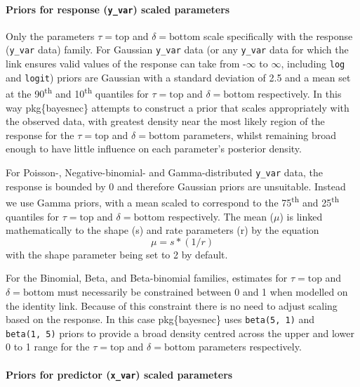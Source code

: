 \documentclass[
]{jss}
\begin{document}
\hypertarget{priors-for-response-y_var-scaled-parameters}{%
\paragraph{\texorpdfstring{Priors for response (\texttt{y\_var}) scaled
parameters}{Priors for response (y\_var) scaled parameters}}\label{priors-for-response-y_var-scaled-parameters}}

Only the parameters \(\tau = \text{top}\) and \(\delta = \text{bottom}\)
scale specifically with the response (\texttt{y\_var} data) family. For
Gaussian \texttt{y\_var} data (or any \texttt{y\_var} data for which the
link ensures valid values of the response can take from -\(\infty\) to
\(\infty\), including \texttt{log} and \texttt{logit}) priors are
Gaussian with a standard deviation of 2.5 and a mean set at the
90\textsuperscript{th} and 10\textsuperscript{th} quantiles for
\(\tau = \text{top}\) and \(\delta = \text{bottom}\) respectively. In
this way pkg\{bayesnec\} attempts to construct a prior that scales
appropriately with the observed data, with greatest density near the
most likely region of the response for the \(\tau = \text{top}\) and
\(\delta = \text{bottom}\) parameters, whilst remaining broad enough to
have little influence on each parameter's posterior density.

For Poisson-, Negative-binomial- and Gamma-distributed \texttt{y\_var}
data, the response is bounded by 0 and therefore Gaussian priors are
unsuitable. Instead we use Gamma priors, with a mean scaled to
correspond to the 75\textsuperscript{th} and 25\textsuperscript{th}
quantiles for \(\tau = \text{top}\) and \(\delta = \text{bottom}\)
respectively. The mean (\(\mu\)) is linked mathematically to the shape
(s) and rate parameters (r) by the equation \[ \mu = s * (1/r) \] with
the shape parameter being set to 2 by default.

For the Binomial, Beta, and Beta-binomial families, estimates for
\(\tau = \text{top}\) and \(\delta = \text{bottom}\) must necessarily be
constrained between 0 and 1 when modelled on the identity link. Because
of this constraint there is no need to adjust scaling based on the
response. In this case pkg\{bayesnec\} uses \texttt{beta(5,\ 1)} and
\texttt{beta(1,\ 5)} priors to provide a broad density centred across
the upper and lower 0 to 1 range for the \(\tau = \text{top}\) and
\(\delta = \text{bottom}\) parameters respectively.

\hypertarget{priors-for-predictor-x_var-scaled-parameters}{%
\paragraph{\texorpdfstring{Priors for predictor (\texttt{x\_var}) scaled
parameters}{Priors for predictor (x\_var) scaled parameters}}\label{priors-for-predictor-x_var-scaled-parameters}}
\end{document}
